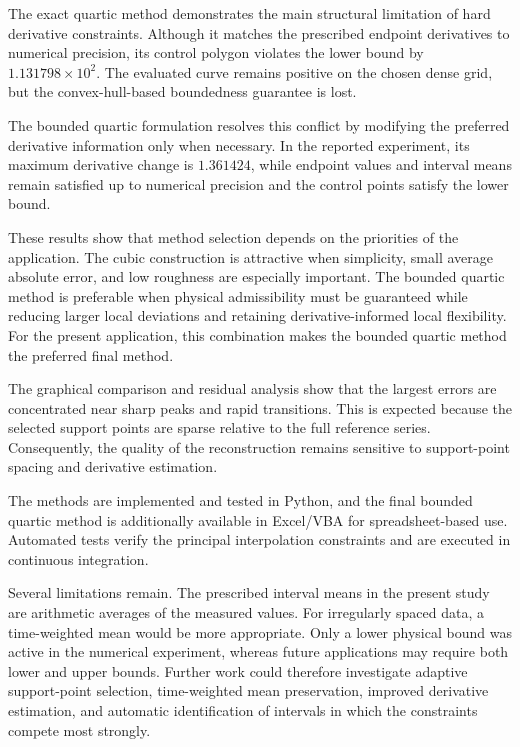 \documentclass[12pt,a4paper]{article}
\begin{document}
The exact quartic method demonstrates the main structural limitation of hard
derivative constraints. Although it matches the prescribed endpoint
derivatives to numerical precision, its control polygon violates the lower
bound by \(1.131798\times 10^{2}\). The evaluated curve remains positive on
the chosen dense grid, but the convex-hull-based boundedness guarantee is
lost.

The bounded quartic formulation resolves this conflict by modifying the
preferred derivative information only when necessary. In the reported
experiment, its maximum derivative change is \(1.361424\), while endpoint
values and interval means remain satisfied up to numerical precision and the
control points satisfy the lower bound.

These results show that method selection depends on the priorities of the
application. The cubic construction is attractive when simplicity, small
average absolute error, and low roughness are especially important. The
bounded quartic method is preferable when physical admissibility must be
guaranteed while reducing larger local deviations and retaining
derivative-informed local flexibility. For the present application, this
combination makes the bounded quartic method the preferred final method.

The graphical comparison and residual analysis show that the largest errors
are concentrated near sharp peaks and rapid transitions. This is expected
because the selected support points are sparse relative to the full reference
series. Consequently, the quality of the reconstruction remains sensitive to
support-point spacing and derivative estimation.

The methods are implemented and tested in Python, and the final bounded
quartic method is additionally available in Excel/VBA for spreadsheet-based
use. Automated tests verify the principal interpolation constraints and are
executed in continuous integration.

Several limitations remain. The prescribed interval means in the present
study are arithmetic averages of the measured values. For irregularly spaced
data, a time-weighted mean would be more appropriate. Only a lower physical
bound was active in the numerical experiment, whereas future applications may
require both lower and upper bounds. Further work could therefore investigate
adaptive support-point selection, time-weighted mean preservation, improved
derivative estimation, and automatic identification of intervals in which the
constraints compete most strongly.

\clearpage
\printbibliography[heading=bibintoc,title={References}]

\clearpage
{}
{}
\listoffigures

\clearpage
{}
{}
\listoftables

\clearpage
{}
{}
\lstlistoflistings
\end{document}

